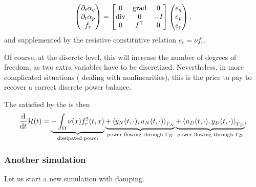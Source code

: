 \documentclass[letterpaper,10pt,english]{sphinxmanual}
\begin{document}
\begin{equation}\label{equation:examples/wave:with-diss}
\begin{split}   \begin{pmatrix} \partial_t \alpha_q \\ \partial_t \alpha_p \\ f_r \end{pmatrix}
   =
   \begin{bmatrix} 0 & {\rm grad} & 0 \\ {\rm div} & 0 & -I \\ 0 & I^\top & 0 \end{bmatrix}
   \begin{pmatrix} e_q \\ e_p \\ e_r \end{pmatrix},\end{split}
\end{equation}
\sphinxAtStartPar
and supplemented by the resistive constitutive relation
\(e_r = \nu f_r\).

\sphinxAtStartPar
Of course, at the discrete level, this will increase the number of
degrees of freedom, as two extra variables have to be discretized.
Nevertheless, in more complicated situations ( dealing with
non\sphinxhyphen{}linearities), this is the price to pay to recover a correct discrete
power balance.

\sphinxAtStartPar
The  satisfied by the  is then
\begin{equation*}
\begin{split}\frac{\rm d}{{\rm d}t} \mathcal{H}(t) = \underbrace{-\int_\Omega \nu(x) f_r^2(t,x)}_{\text{dissipated power}} \underbrace{+ \left\langle y_N(t,\cdot), u_N(t,\cdot)\right\rangle_{\Gamma_N}}_{\text{power flowing through }\Gamma_N} \underbrace{+ \left\langle u_D(t,\cdot), y_D(t,\cdot) \right\rangle_{\Gamma_D}}_{\text{power flowing through }\Gamma_D},\end{split}
\end{equation*}

\subsubsection{Another simulation}
\label{\detokenize{examples/wave:another-simulation}}
\sphinxAtStartPar
Let us start a new simulation with damping.
\end{document}
